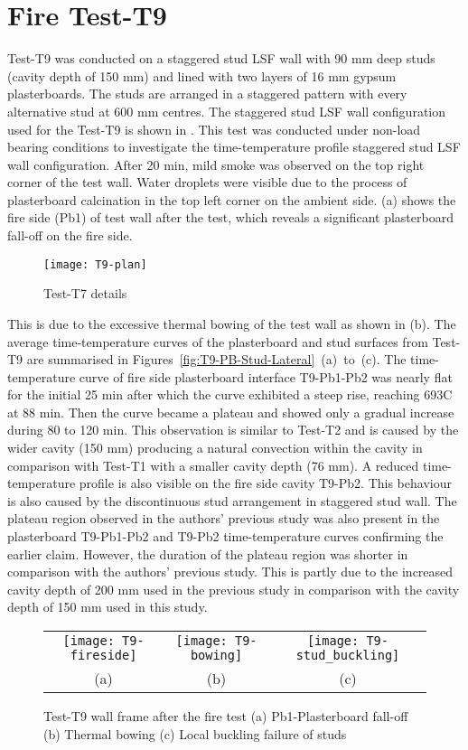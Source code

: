 \section{Fire Test-T9}

Test-T9 was conducted on a staggered stud LSF wall with 90 mm deep studs (cavity depth of 150 mm) and lined with two layers of 16 mm gypsum plasterboards. The studs are arranged in a staggered pattern with every alternative stud at 600 mm centres. The staggered stud LSF wall configuration used for the Test-T9 is shown in . This test was conducted under non-load bearing conditions to investigate the time-temperature profile staggered stud LSF wall configuration. After 20 min, mild smoke was observed on the top right corner of the test wall. Water droplets were visible due to the process of plasterboard calcination in the top left corner on the ambient side. (a) shows the fire side (Pb1) of test wall after the test, which reveals a significant plasterboard fall-off on the fire side. 
\begin{figure}[!htbp]
	\centering
		\texttt{[image: T9-plan]}
		\caption{Test-T7 details}
		\label{fig:T9-plan}
\end{figure}

This is due to the excessive thermal bowing of the test wall as shown in  (b). The average time-temperature curves of the plasterboard and stud surfaces from Test-T9 are summarised in Figures~\ref{fig:T9-PB-Stud-Lateral}~(a)~to~(c). The time-temperature curve of fire side plasterboard interface T9-Pb1-Pb2 was nearly flat for the initial 25 min after which the curve exhibited a steep rise, reaching 693\degree C at 88 min. Then the curve became a plateau and showed only a gradual increase during 80 to 120 min. This observation is similar to Test-T2 and is caused by the wider cavity (150 mm) producing a natural convection within the cavity in comparison with Test-T1 with a smaller cavity depth (76 mm). A reduced time-temperature profile is also visible on the fire side cavity T9-Pb2. This behaviour is also caused by the discontinuous stud arrangement in staggered stud wall. The plateau region observed in the authors' previous study \citet{Magarabooshanam2019} was also present in the plasterboard T9-Pb1-Pb2 and T9-Pb2 time-temperature curves confirming the earlier claim. However, the duration of the plateau region was shorter in comparison with the authors' previous study. This is partly due to the increased cavity depth of 200 mm used in the previous study in comparison with the cavity depth of 150 mm used in this study.  
\begin{figure}[!htbp]
	\centering
		\begin{tabular}{ccc}
			\texttt{[image: T9-fireside]} & \texttt{[image: T9-bowing]} & \texttt{[image: T9-stud\_buckling]} \\ 
			(a) & (b) & (c)  \\ 
		\end{tabular} 
		\caption{Test-T9 wall frame after the fire test (a) Pb1-Plasterboard fall-off (b) Thermal bowing (c) Local buckling failure of studs}
		\label{fig:T9-fireside-bowing}
\end{figure}

